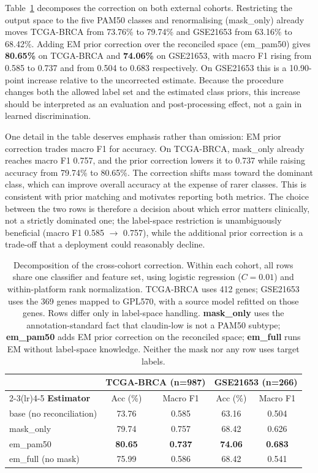 \documentclass[11pt,a4paper]{article}
\begin{document}
Table~\ref{tab:labelspace} decomposes the correction on both external cohorts. Restricting the
output space to the five PAM50 classes and renormalising (mask\_only) already moves TCGA-BRCA
from 73.76\% to 79.74\% and GSE21653 from 63.16\% to 68.42\%. Adding EM prior correction over the
reconciled space (em\_pam50) gives \textbf{80.65\%} on TCGA-BRCA and \textbf{74.06\%} on GSE21653,
with macro F1 rising from 0.585 to 0.737 and from 0.504 to 0.683 respectively. On GSE21653 this
is a 10.90-point increase relative to the uncorrected estimate. Because the procedure changes
both the allowed label set and the estimated class priors, this increase should be interpreted as
an evaluation and post-processing effect, not a gain in learned discrimination.

One detail in the table deserves emphasis rather than omission: EM prior correction trades macro
F1 for accuracy. On TCGA-BRCA, mask\_only already reaches macro F1 0.757, and the prior correction
lowers it to 0.737 while raising accuracy from 79.74\% to 80.65\%. The correction shifts mass toward
the dominant class, which can improve overall accuracy at the expense of rarer classes. This is
consistent with prior matching and motivates reporting both metrics. The choice between the
two rows is therefore a decision about which error matters clinically, not a strictly dominated one;
the label-space restriction is unambiguously beneficial (macro F1 0.585 $\rightarrow$ 0.757), while
the additional prior correction is a trade-off that a deployment could reasonably decline.

\begin{table}[H]
\centering
\caption{Decomposition of the cross-cohort correction. Within each cohort, all rows share one
classifier and feature set, using logistic regression ($C=0.01$) and within-platform rank
normalization. TCGA-BRCA uses 412 genes; GSE21653 uses the 369 genes mapped to GPL570, with a
source model refitted on those genes. Rows differ only in label-space handling. \textbf{mask\_only}
uses the annotation-standard fact that claudin-low is not a PAM50 subtype; \textbf{em\_pam50}
adds EM prior correction on the reconciled space; \textbf{em\_full} runs EM without label-space
knowledge. Neither the mask nor any row uses target labels.}
\label{tab:labelspace}
\begin{tabular}{lcccc}
\toprule
 & \multicolumn{2}{c}{\textbf{TCGA-BRCA (n=987)}} & \multicolumn{2}{c}{\textbf{GSE21653 (n=266)}} \\
\cmidrule(lr){2-3}\cmidrule(lr){4-5}
\textbf{Estimator} & Acc (\%) & Macro F1 & Acc (\%) & Macro F1 \\
\midrule
base (no reconciliation) & 73.76 & 0.585 & 63.16 & 0.504 \\
mask\_only               & 79.74 & 0.757 & 68.42 & 0.626 \\
em\_pam50                & \textbf{80.65} & \textbf{0.737} & \textbf{74.06} & \textbf{0.683} \\
em\_full (no mask)       & 75.99 & 0.586 & 68.42 & 0.541 \\
\bottomrule
\end{tabular}

\vspace{2pt}
\end{table}
\end{document}
